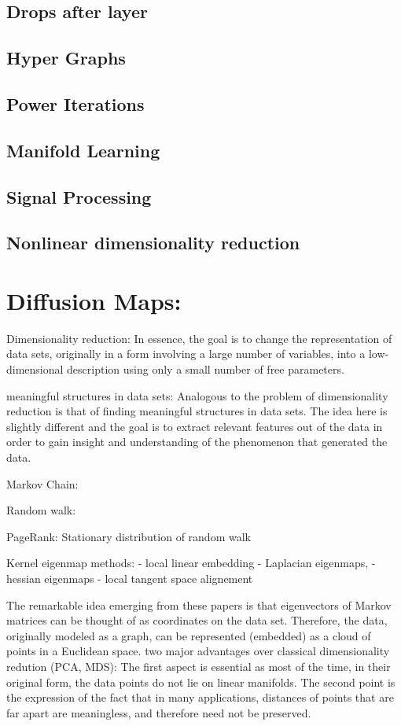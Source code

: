 \subsection{Drops after layer}

\subsection{Hyper Graphs}
\subsection{Power Iterations}
\subsection{Manifold Learning}
\subsection{Signal Processing}
\subsection{Nonlinear dimensionality reduction}


\section{Diffusion Maps:}
\citet{diffusionMaps}
\cite{diffusionMaps}

Dimensionality reduction:
In essence, the goal is to change the representation of data sets, originally in a form involving a large number of variables, into a
low-dimensional description using only a small number of free parameters.

meaningful structures in data sets:
Analogous to the problem of dimensionality reduction is that of finding meaningful structures in data sets. The idea here is slightly
different and the goal is to extract relevant features out of the data in order to gain insight and understanding of the
phenomenon that generated the data.

Markov Chain:

Random walk:

PageRank:
Stationary distribution of random walk

Kernel eigenmap methods:
- local linear embedding
- Laplacian eigenmaps,
- hessian eigenmaps
- local tangent space alignement

The remarkable idea emerging from these papers is that eigenvectors of Markov matrices can be thought of as coordinates
on the data set. Therefore, the data, originally modeled as a graph, can be represented (embedded) as a cloud of points
in a Euclidean space.
two major advantages over classical dimensionality redution (PCA, MDS):
The first aspect is essential as most of the time, in their original form, the data points do not lie on
 linear manifolds.
 The second point is the expression of the fact that in many
applications, distances of points that are far apart are meaningless, and therefore need not be preserved.

